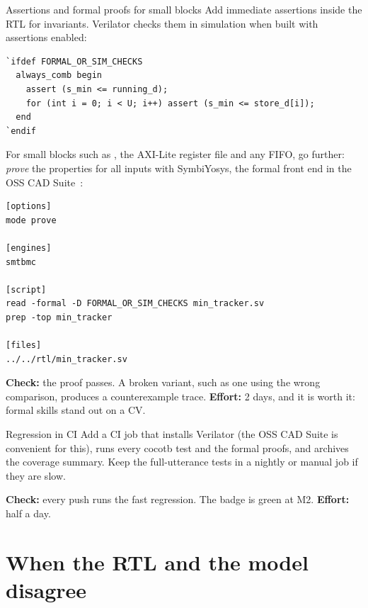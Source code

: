 \begin{stepbox}[label=st:verif:formal]{Assertions and formal proofs for small blocks}
Add immediate assertions inside the RTL for invariants. Verilator checks them
in simulation when built with assertions enabled:

\begin{lstlisting}[style=sv]
`ifdef FORMAL_OR_SIM_CHECKS
  always_comb begin
    assert (s_min <= running_d);
    for (int i = 0; i < U; i++) assert (s_min <= store_d[i]);
  end
`endif
\end{lstlisting}

For small blocks such as , the AXI-Lite register file and any
FIFO, go further: \emph{prove} the properties for all inputs with SymbiYosys,
the formal front end in the OSS CAD Suite~\cite{ch12-13:sbydocs}:

\begin{lstlisting}[style=plain,caption={\texttt{tb/formal/min\_tracker.sby} (adapt to the current SymbiYosys documentation).}]
[options]
mode prove

[engines]
smtbmc

[script]
read -formal -D FORMAL_OR_SIM_CHECKS min_tracker.sv
prep -top min_tracker

[files]
../../rtl/min_tracker.sv
\end{lstlisting}

\textbf{Check:} the proof passes. A broken variant, such as one using the wrong
comparison, produces a counterexample trace. \textbf{Effort:} 2 days, and it is
worth it: formal skills stand out on a CV.
\end{stepbox}

\begin{stepbox}[label=st:verif:ci]{Regression in CI}
Add a CI job that installs Verilator (the OSS CAD Suite is convenient for this),
runs every cocotb test and the formal proofs, and archives the coverage summary.
Keep the full-utterance tests in a nightly or manual job if they are slow.

\textbf{Check:} every push runs the fast regression. The badge is green at M2.
\textbf{Effort:} half a day.
\end{stepbox}

\section{When the RTL and the model disagree}\label{sec:verif:debug}

